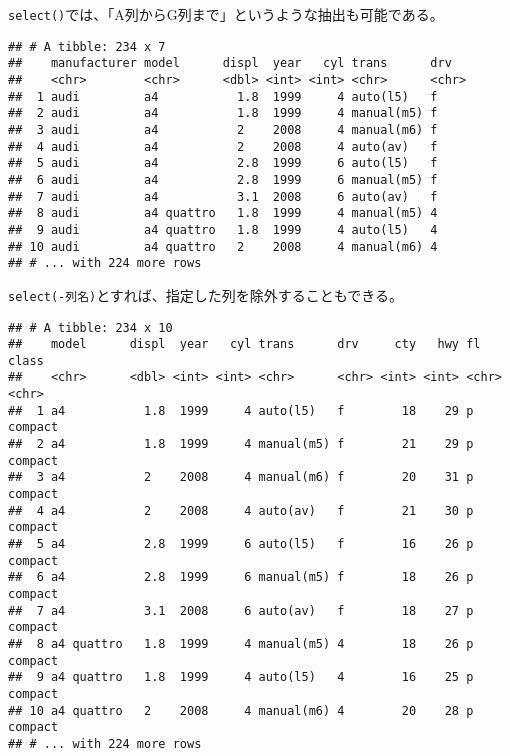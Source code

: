 \documentclass[]{book}
\newenvironment{Shaded}{\begin{snugshade}}{\end{snugshade}}
\newcommand{\KeywordTok}[1]{\textcolor[rgb]{0.13,0.29,0.53}{\textbf{#1}}}
\newcommand{\StringTok}[1]{\textcolor[rgb]{0.31,0.60,0.02}{#1}}
\newcommand{\CommentTok}[1]{\textcolor[rgb]{0.56,0.35,0.01}{\textit{#1}}}
\newcommand{\OperatorTok}[1]{\textcolor[rgb]{0.81,0.36,0.00}{\textbf{#1}}}
\newcommand{\NormalTok}[1]{#1}
\begin{document}
\texttt{select()}では、「A列からG列まで」というような抽出も可能である。

\begin{Shaded}
\end{Shaded}

\begin{verbatim}
## # A tibble: 234 x 7
##    manufacturer model      displ  year   cyl trans      drv  
##    <chr>        <chr>      <dbl> <int> <int> <chr>      <chr>
##  1 audi         a4           1.8  1999     4 auto(l5)   f    
##  2 audi         a4           1.8  1999     4 manual(m5) f    
##  3 audi         a4           2    2008     4 manual(m6) f    
##  4 audi         a4           2    2008     4 auto(av)   f    
##  5 audi         a4           2.8  1999     6 auto(l5)   f    
##  6 audi         a4           2.8  1999     6 manual(m5) f    
##  7 audi         a4           3.1  2008     6 auto(av)   f    
##  8 audi         a4 quattro   1.8  1999     4 manual(m5) 4    
##  9 audi         a4 quattro   1.8  1999     4 auto(l5)   4    
## 10 audi         a4 quattro   2    2008     4 manual(m6) 4    
## # ... with 224 more rows
\end{verbatim}

\texttt{select(-列名)}とすれば、指定した列を除外することもできる。

\begin{Shaded}
\end{Shaded}

\begin{verbatim}
## # A tibble: 234 x 10
##    model      displ  year   cyl trans      drv     cty   hwy fl    class  
##    <chr>      <dbl> <int> <int> <chr>      <chr> <int> <int> <chr> <chr>  
##  1 a4           1.8  1999     4 auto(l5)   f        18    29 p     compact
##  2 a4           1.8  1999     4 manual(m5) f        21    29 p     compact
##  3 a4           2    2008     4 manual(m6) f        20    31 p     compact
##  4 a4           2    2008     4 auto(av)   f        21    30 p     compact
##  5 a4           2.8  1999     6 auto(l5)   f        16    26 p     compact
##  6 a4           2.8  1999     6 manual(m5) f        18    26 p     compact
##  7 a4           3.1  2008     6 auto(av)   f        18    27 p     compact
##  8 a4 quattro   1.8  1999     4 manual(m5) 4        18    26 p     compact
##  9 a4 quattro   1.8  1999     4 auto(l5)   4        16    25 p     compact
## 10 a4 quattro   2    2008     4 manual(m6) 4        20    28 p     compact
## # ... with 224 more rows
\end{verbatim}
\end{document}
